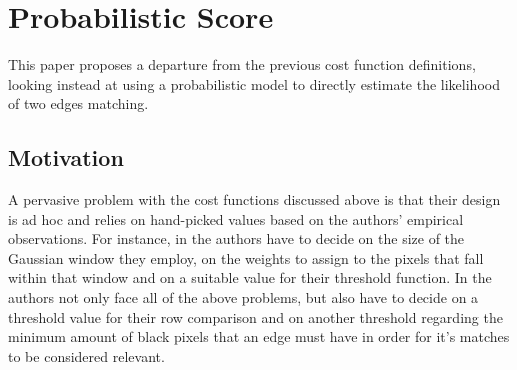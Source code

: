 \chapter{Probabilistic Score}
This paper proposes a departure from the previous cost function definitions, looking instead at using a probabilistic model to directly estimate the likelihood of two edges matching.
\section{Motivation}
A pervasive problem with the cost functions discussed above is that their design is ad hoc and relies on hand-picked values based on the authors' empirical observations. For instance, in \cite{P1} the authors have to decide on the size of the Gaussian window they employ, on the weights to assign to the pixels that fall within that window and on a suitable value for their threshold function.  In \cite{P2} the authors not only face all of the above problems, but also have to decide on a threshold value for their row comparison and on another threshold regarding the minimum amount of black pixels that an edge must have in order for it's matches to be considered relevant. 

